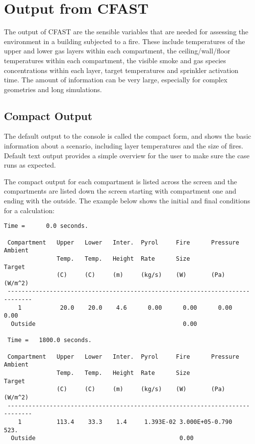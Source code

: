\chapter{Output from CFAST}

The output of CFAST are the sensible variables that are needed for assessing the environment in a building subjected to a fire. These include temperatures of the upper and lower gas layers within each compartment, the ceiling/wall/floor temperatures within each compartment, the visible smoke and gas species concentrations within each layer, target temperatures and sprinkler activation time.  The amount of information can be very large, especially for complex geometries and long simulations.

\section{Compact Output}

The default output to the console is called the compact form, and shows the basic information about a scenario, including layer temperatures and the size of fires. Default text output provides a simple overview for the user to make sure the case runs as expected.

The compact output for each compartment is listed across the screen and the compartments are listed down the screen starting with compartment one and ending with the outside.  The example below shows the initial and final conditions for a calculation:

\begin{lstlisting}[basicstyle=\tiny]
 Time =      0.0 seconds.

 Compartment   Upper   Lower   Inter.  Pyrol     Fire      Pressure  Ambient
               Temp.   Temp.   Height  Rate      Size                Target
               (C)     (C)     (m)     (kg/s)    (W)       (Pa)      (W/m^2)
 -----------------------------------------------------------------------------
    1           20.0    20.0    4.6      0.00      0.00      0.00      0.00
  Outside                                          0.00

 Time =   1800.0 seconds.

 Compartment   Upper   Lower   Inter.  Pyrol     Fire      Pressure  Ambient
               Temp.   Temp.   Height  Rate      Size                Target
               (C)     (C)     (m)     (kg/s)    (W)       (Pa)      (W/m^2)
 -----------------------------------------------------------------------------
    1          113.4    33.3    1.4     1.393E-02 3.000E+05-0.790      523.
  Outside                                         0.00
\end{lstlisting}

